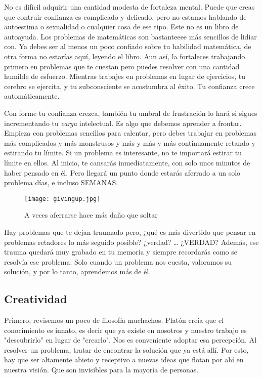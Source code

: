 No es difícil adquirir una cantidad modesta de fortaleza mental. 
Puede que creas que contruir confianza es complicado y delicado, 
pero no estamos hablando de autoestima o sexualidad o cualquier cosa de 
ese tipo. Este no es un libro de autoayuda. Los problemas de matemáticas 
son bastanteeee más sencillos de lidiar con. Ya debes ser al menos un poco 
confiado sobre tu habilidad matemática, de otra forma no estarías aquí, 
leyendo el libro. Aun así, la fortaleces trabajando primero en problemas 
que te cuestan pero puedes resolver con una cantidad humilde de esfuerzo. 
Mientras trabajes en problemas en lugar de ejercicios, tu cerebro se 
ejercita, y tu subconsciente se acostumbra al éxito. 
Tu confianza crece automáticamente.

Con forme tu confianza crezca, también tu umbral de frustración lo hará 
si sigues incrementando tu \textit{carga} intelectual. Es algo que 
debemos aprender a frontar.
Empieza con problemas sencillos para calentar, pero debes trabajar 
en problemas más complicados y más monstrusos y más y más y más 
continuamente retando y estirando tu límite. Si un problema es interesante, 
no te importará estirar tu límite en ellos. Al inicio, te cansarás 
inmediatamente, con solo unos minutos de haber pensado en él. Pero 
llegará un punto donde estarás aferrado a un solo problema días, e 
incluso SEMANAS. 

\begin{figure}[h]
    \centering
    \texttt{[image: givingup.jpg]}
    \caption{A veces aferrarse hace más daño que soltar}
\end{figure}

Hay problemas que te dejan traumado pero, ¿qué es más divertido que 
pensar en problemas retadores lo más seguido posible? ¿verdad? \dots
¿VERDAD? Además, ese trauma quedará muy grabado en tu memoria y 
siempre recordarás como se resolvía ese problema. Solo cuando un problema 
nos cuesta, valoramos su solución, y por lo tanto, aprendemos más de él.

\subsection{Creatividad}

Primero, revisemos un poco de filosofía muchachos. Platón creía que 
el conocimiento es innato, es decir que ya existe en nosotros y 
nuestro trabajo es "descubrirlo" en lugar de "crearlo". Nos es conveniente 
adoptar esa percepción. Al resolver un problema, tratar de encontrar 
la solución que ya está allí. Por esto, hay que ser altamente abieto 
y receptivo a nuevas ideas que flotan por ahí en nuestra visión. 
Que son invisibles para la mayoría de personas. 

